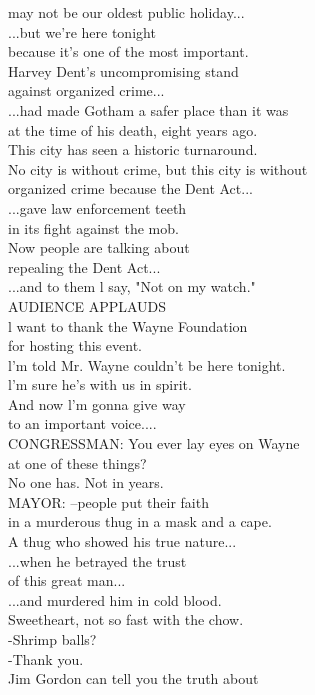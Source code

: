 \documentclass{article}
\begin{document}
\begin{multicols}{3}
may not be our oldest public holiday...\\
...but we're here tonight\\
because it's one of the most important.\\
Harvey Dent's uncompromising stand\\
against organized crime...\\
...had made Gotham a safer place than it was\\
at the time of his death, eight years ago.\\
This city has seen a historic turnaround.\\
No city is without crime, but this city is without\\
organized crime because the Dent Act...\\
...gave law enforcement teeth\\
in its fight against the mob.\\
Now people are talking about\\
repealing the Dent Act...\\
...and to them l say, "Not on my watch."\\
AUDIENCE APPLAUDS\\
l want to thank the Wayne Foundation\\
for hosting this event.\\
l'm told Mr. Wayne couldn't be here tonight.\\
l'm sure he's with us in spirit.\\
And now l'm gonna give way\\
to an important voice....\\
CONGRESSMAN: You ever lay eyes on Wayne\\
at one of these things?\\
No one has. Not in years.\\
MAYOR: --people put their faith\\
in a murderous thug in a mask and a cape.\\
A thug who showed his true nature...\\
...when he betrayed the trust\\
of this great man...\\
...and murdered him in cold blood.\\
Sweetheart, not so fast with the chow.\\
-Shrimp balls?\\
-Thank you.\\
Jim Gordon can tell you the truth about\\

\end{multicols}
\end{document}
